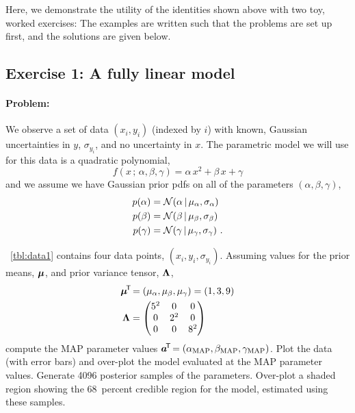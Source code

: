 Here, we demonstrate the utility of the identities shown above with two toy,
worked exercises: The examples are written such that the problems are set up
first, and the solutions are given below.


\subsection{Exercise 1: A fully linear model}

\paragraph{Problem:} We observe a set of data $(x_i, y_i)$ (indexed by $i$) with
known, Gaussian uncertainties in $y$, $\sigma_{y_i}$, and no uncertainty in $x$.
The parametric model we will use for this data is a quadratic polynomial,
\begin{equation}
  f(x \,;\, \alpha, \beta, \gamma) = \alpha\,x^2 + \beta\,x + \gamma
\end{equation}
and we assume we have Gaussian prior pdfs on all of the parameters $(\alpha,
\beta, \gamma)$,
\begin{align}
  p(\alpha) &= \mathcal{N}\!\,(\alpha \,|\, \mu_\alpha, \sigma_\alpha)\\
  p(\beta) &= \mathcal{N}\!\,(\beta \,|\, \mu_\beta, \sigma_\beta)\\
  p(\gamma) &= \mathcal{N}\!\,(\gamma \,|\, \mu_\gamma, \sigma_\gamma)
  ~ .
\end{align}

\tablename~\ref{tbl:data1} contains four data points, $(x_i, y_i,
\sigma_{y_i})$.
Assuming values for the prior means, $\boldsymbol{\mu}$, and prior variance tensor,
$\mathbf{\Lambda}$,
\begin{align}
  \boldsymbol{\mu}^{\!\mathsf{T}\!} &= (\mu_\alpha, \mu_\beta, \mu_\gamma) = (1, 3, 9)\\
  \mathbf{\Lambda} &=
    \begin{pmatrix}
      5^2 & 0 & 0\\
      0 & 2^2 & 0\\
      0 & 0 & 8^2
    \end{pmatrix}\\
\end{align}
compute the MAP parameter values $\boldsymbol{a}^{\!\mathsf{T}\!} = (\alpha_{\rm MAP}, \beta_{\rm MAP},
\gamma_{\rm MAP})$.
Plot the data (with error bars) and over-plot the model evaluated at the
MAP parameter values.
Generate 4096 posterior samples of the parameters.
Over-plot a shaded region showing the 68~percent credible region for the model,
estimated using these samples.

